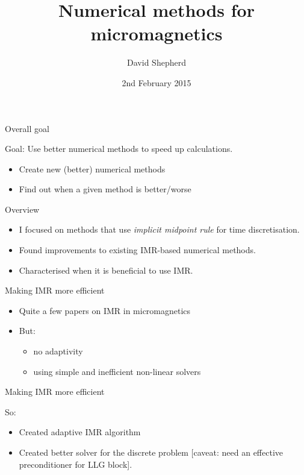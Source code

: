 \documentclass[18pt]{beamer}
\title{Numerical methods for micromagnetics}
\author[David Shepherd]{David Shepherd}
\institute[UoM]{The University of Manchester}
\date{2nd February 2015}
\newlength{\wideitemsep}
\let\olditem\item
\renewcommand{\item}{\setlength{\itemsep}{\wideitemsep}\olditem}
\begin{document}
\begin{frame}
  \titlepage
\end{frame}

\begin{frame}{Overall goal}
  \begin{center}
    {\huge Goal: Use better numerical methods to speed up calculations.}
  \end{center}

  \begin{itemize}
  \item Create new (better) numerical methods
  \item Find out when a given method is better/worse
  \end{itemize}
\end{frame}

\begin{frame}{Overview}
  \begin{itemize}
  \item I focused on methods that use \emph{implicit midpoint rule} for time discretisation.
  \item Found improvements to existing IMR-based numerical methods.
  \item Characterised when it is beneficial to use IMR.
  \end{itemize}
\end{frame}


\begin{frame}{Making IMR more efficient}

  \begin{itemize}
  \item Quite a few papers on IMR in micromagnetics
  \item But:
    \begin{itemize}
    \item no adaptivity
    \item using simple and inefficient non-linear solvers
    \end{itemize}
 \end{itemize}
 \end{frame}

\begin{frame}{Making IMR more efficient}

  So:
  \begin{itemize}
  \item Created adaptive IMR algorithm
  \item Created better solver for the discrete problem [caveat: need an
    effective preconditioner for LLG block].
  \end{itemize}

\end{frame}
\end{document}
